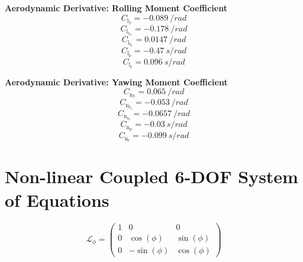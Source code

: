 \documentclass{article}
\begin{document}
\vfill\null
\textbf{Aerodynamic Derivative: Rolling Moment Coefficient}
\begin{equation}
C_{\mathrm{l}_{\mathrm{\beta}}} = -0.089\ /rad
\end{equation}
\begin{equation}
C_{\mathrm{l}_{\mathrm{\delta_{\mathrm{a}}}}} = -0.178\ /rad
\end{equation}
\begin{equation}
C_{\mathrm{l}_{\mathrm{\delta_{\mathrm{r}}}}} = 0.0147\ /rad
\end{equation}
\begin{equation}
C_{\mathrm{l}_{\mathrm{p}}} = -0.47\ s/rad
\end{equation}
\begin{equation}
C_{\mathrm{l}_{\mathrm{r}}} = 0.096\ s/rad
\end{equation}

\vfill\null
\textbf{Aerodynamic Derivative: Yawing Moment Coefficient}
\begin{equation}
C_{\mathrm{n}_{\mathrm{\beta}}} = 0.065\ /rad
\end{equation}
\begin{equation}
C_{\mathrm{n}_{\mathrm{\delta_{\mathrm{a}}}}} = -0.053\ /rad
\end{equation}
\begin{equation}
C_{\mathrm{n}_{\mathrm{\delta_{\mathrm{r}}}}} = -0.0657\ /rad
\end{equation}
\begin{equation}
C_{\mathrm{n}_{\mathrm{p}}} = -0.03\ s/rad
\end{equation}
\begin{equation}
C_{\mathrm{n}_{\mathrm{r}}} = -0.099\ s/rad
\end{equation}

\newpage

\onecolumn
\section{Non-linear Coupled 6-DOF System of Equations}

\begin{dmath}
\mathcal{L}_{\phi}=\left(\begin{array}{ccc} 1 & 0 & 0\\ 0 & \cos\left(\phi \right) & \sin\left(\phi \right)\\ 0 & -\sin\left(\phi \right) & \cos\left(\phi \right) \end{array}\right)
\end{dmath}
\end{document}
